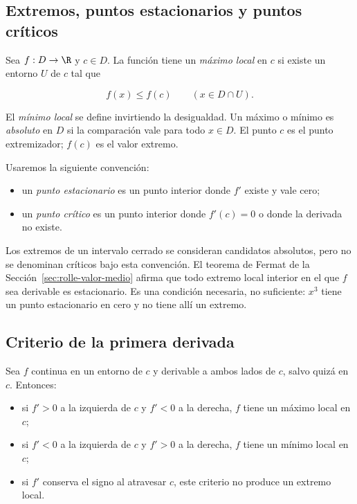 \subsection{Extremos, puntos estacionarios y puntos críticos}

Sea \(f:D\to\R\) y \(c\in D\). La función tiene un \emph{máximo local} en
\(c\) si existe un entorno \(U\) de \(c\) tal que

\[
  f(x)\le f(c) \qquad(x\in D\cap U).
\]

El \emph{mínimo local} se define invirtiendo la desigualdad. Un máximo o
mínimo es \emph{absoluto} en \(D\) si la comparación vale para todo \(x\in D\).
El punto \(c\) es el punto extremizador; \(f(c)\) es el valor extremo.

Usaremos la siguiente convención:

\begin{itemize}
  \item un \emph{punto estacionario} es un punto interior donde \(f'\) existe
        y vale cero;
  \item un \emph{punto crítico} es un punto interior donde \(f'(c)=0\) o donde
        la derivada no existe.
\end{itemize}

Los extremos de un intervalo cerrado se consideran candidatos absolutos, pero
no se denominan críticos bajo esta convención. El teorema de Fermat de la
Sección~\ref{sec:rolle-valor-medio} afirma que todo extremo local interior en
el que \(f\) sea derivable es estacionario. Es una condición necesaria, no
suficiente: \(x^3\) tiene un punto estacionario en cero y no tiene allí un
extremo.

\subsection{Criterio de la primera derivada}

\begin{teorema}
Sea \(f\) continua en un entorno de \(c\) y derivable a ambos lados de \(c\),
salvo quizá en \(c\). Entonces:

\begin{itemize}
  \item si \(f'>0\) a la izquierda de \(c\) y \(f'<0\) a la derecha, \(f\)
        tiene un máximo local en \(c\);
  \item si \(f'<0\) a la izquierda de \(c\) y \(f'>0\) a la derecha, \(f\)
        tiene un mínimo local en \(c\);
  \item si \(f'\) conserva el signo al atravesar \(c\), este criterio no
        produce un extremo local.
\end{itemize}
\end{teorema}

